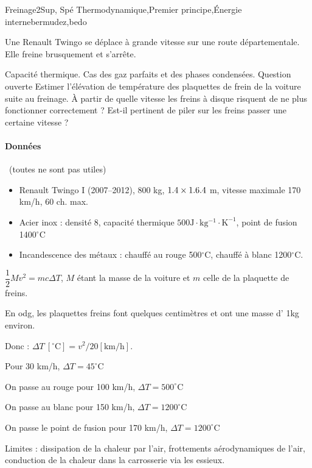 \begin{exercise}{Freinage}{2}{Sup, Spé}
{Thermodynamique,Premier principe,\'Energie interne}{bermudez,bedo}

Une Renault Twingo se déplace à grande vitesse sur une route départementale. Elle freine brusquement et s'arrête.

\begin{questions}
    \questioncours Capacité thermique. Cas des gaz parfaits et des phases condensées.
    \question \textsf{Question ouverte} Estimer l'élévation de température des plaquettes de frein de la voiture suite au freinage. \`A partir de quelle vitesse les freins à disque risquent de ne plus fonctionner correctement ? Est-il pertinent de piler sur les freins passer une certaine vitesse ?
\end{questions}

\paragraph{Données}~(toutes ne sont pas utiles)
\begin{itemize}
    \item Renault Twingo I (2007--2012), 800 kg, $1.4\times1.6\time 3.4$ m, vitesse maximale 170 km/h, 60 ch. max.
    \item Acier inox : densité 8, capacité thermique $\mathrm{500 J\cdot kg^{-1}\cdot K^{-1}}$, point de fusion 1400$^\circ$C
    \item Incandescence des métaux : chauffé au rouge 500$^\circ$C, chauffé à blanc 1200$^\circ$C.  
\end{itemize}

\end{exercise}

\begin{solution}

$\dfrac{1}{2}M v^2 = m c \Delta T$, $M$ étant la masse de la voiture et $m$ celle de la plaquette de freins.

En odg, les plaquettes freins font quelques centimètres et ont une masse d' 1kg environ.

Donc : $\Delta T \ [^\circ\text{C}] = v^2/20 [\mathrm{km/h}]$.

Pour 30 km/h, $\Delta T = 45^\circ$C

On passe au rouge pour 100 km/h, $\Delta T = 500^\circ$C

On passe au blanc pour 150 km/h, $\Delta T = 1200^\circ$C

On passe le point de fusion pour 170 km/h, $\Delta T = 1200^\circ$C

\textsf{Limites :} dissipation de la chaleur par l'air, frottements aérodynamiques de l'air, conduction de la chaleur dans la carrosserie via les essieux.

\end{solution}